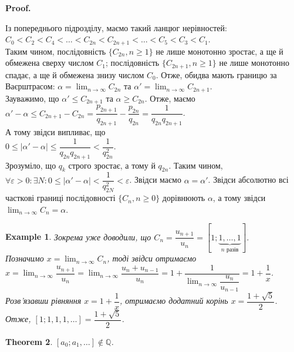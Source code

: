 \documentclass[a4paper, 10pt]{article}
\makeatletter
\theoremstyle{theoremdd}
\newtheorem{theorem}{Theorem}[subsection]
\theoremstyle{theoremdd}
\theoremstyle{theoremdd}
\theoremstyle{theoremdd}
\newtheorem{example}[theorem]{Example}
\theoremstyle{theoremdd}
\theoremstyle{theoremdd}
\theoremstyle{theoremdd}
\theoremstyle{theoremdd}
\renewenvironment{proof}[1][Proof.\\]{\par
\pushQED{\hfill \qed}%
\normalfont \topsep6\p@\@plus6\p@\relax
\trivlist
\item\relax
{\bfseries
#1\@addpunct{.}}\hspace\labelsep\ignorespaces
}{%
\popQED\endtrivlist\@endpefalse
}
\makeatother
\begin{document}
\begin{proof}
Із попереднього підрозділу, маємо такий ланцюг нерівностей:\\
$C_0 < C_2 < C_4 < \dots < C_{2n} < C_{2n+1} < \dots < C_5 < C_3 < C_1$.\\
Таким чином, послідовність $\{C_{2n}, n \geq 1\}$ не лише монотонно зростає, а ще й обмежена сверху числом $C_1$; послідовність $\{C_{2n+1}, n \geq 1\}$ не лише монотонно спадає, а ще й обмежена знизу числом $C_0$. Отже, обидва мають границю за Ваєрштрасом: $\alpha = \displaystyle\lim_{n \to \infty} C_{2n}$ та $\alpha' = \displaystyle\lim_{n \to \infty} C_{2n+1}$. \\
Зауважимо, що $\alpha' \leq C_{2n+1}$ та $\alpha \geq C_{2n}$. Отже, маємо\\
$\alpha' - \alpha \leq C_{2n+1} - C_{2n} = \dfrac{p_{2n+1}}{q_{2n+1}} - \dfrac{p_{2n}}{q_{2n}} = \dfrac{1}{q_{2n}q_{2n+1}}$.\\
А тому звідси випливає, що\\
$0 \leq |\alpha'-\alpha| \leq \dfrac{1}{q_{2n}q_{2n+1}} < \dfrac{1}{q_{2n}^2}$.\\
Зрозуміло, що $q_k$ строго зростає, а тому й $q_{2n}$. Таким чином, $\forall \varepsilon > 0: \exists N: 0 \leq |\alpha'-\alpha| < \dfrac{1}{q_{2N}^2} < \varepsilon$. Звідси маємо $\alpha = \alpha'$. Звідси абсолютно всі часткові границі послідовності $\{C_n, n \geq 0\}$ дорівнюють $\alpha$, а тому звідси $\displaystyle\lim_{n \to \infty} C_n = \alpha$.
\end{proof}

\begin{example}
Зокрема уже доводили, що $C_n = \dfrac{u_{n+1}}{u_n} = [1;\underbrace{1,\dots,1}_{n \text{ разів}}]$.\\
Позначимо $x = \displaystyle\lim_{n \to \infty} C_n$, тоді звідси отримаємо\\
$x = \displaystyle\lim_{n \to \infty} \dfrac{u_{n+1}}{u_n} = \lim_{n \to \infty} \dfrac{u_n+u_{n-1}}{u_n} = 1 + \dfrac{1}{\displaystyle\lim_{n \to \infty} \dfrac{u_n}{u_{n-1}}} = 1 + \dfrac{1}{x}$.\\
Розв'язавши рівняння $x = 1 + \dfrac{1}{x}$, отримаємо додатний корінь $x = \dfrac{1+ \sqrt{5}}{2}$.\\
Отже, $[1;1,1,1,\dots] = \dfrac{1+\sqrt{5}}{2}$.
\end{example}

\begin{theorem}
$[a_0;a_1,\dots] \not\in \mathbb{Q}$.
\end{theorem}
\end{document}
